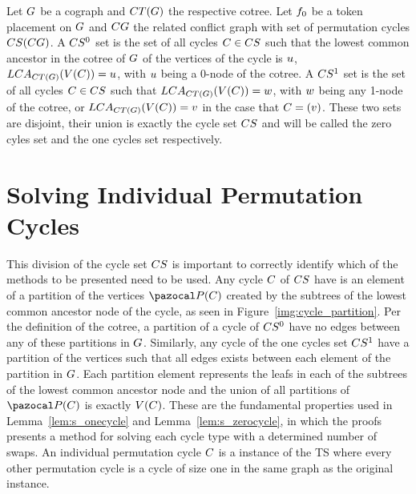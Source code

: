 \documentclass[msc]{ppgccufmg}    %
\begin{document}

Let $G$ be a cograph and $CT(G)$ the respective cotree. 
Let $f_{0}$ be a token placement on $G$ and $CG$ the related 
conflict graph with set of permutation cycles $CS(CG)$.
A $CS^{0}$ set is the set of all cycles $C \in CS$ such that
the lowest common ancestor in the cotree of $G$ of the vertices of the cycle
is $u$, $LCA_{CT(G)}(V(C)) = u$, with 
$u$ being a 0-node of the cotree.
A $CS^{1}$ set is the set of all cycles $C \in CS$ such that
$LCA_{CT(G)}(V(C)) = w$, with $w$ being any
1-node of the cotree, or $LCA_{CT(G)}(V(C)) = v$ 
in the case that $C = (v)$.
These two sets are disjoint, their union is exactly the cycle set $CS$ and
will be called the zero cyles set and the one cycles set respectively.


\section{Solving Individual Permutation Cycles}
\label{sec:solvindpermcycles}

This division of the cycle set $CS$ is important to correctly identify which
of the methods to be presented need to be used.
Any cycle $C$ of  $CS$ have is an element of a partition of the vertices $\partitionFunc
{\cycle}$ created by the subtrees of the lowest common ancestor node of the cycle, 
as seen in Figure~\ref{img:cycle_partition}. 
Per the definition of the cotree, a partition of a cycle of $CS^{0}$ have no 
edges between any of these partitions in $G$.
Similarly, any cycle of the one cycles set $CS^{1}$ have a partition of the
vertices such that all edges exists between each element of the partition in $G$.
Each partition element represents the leafs in each of the subtrees of the lowest 
common ancestor node and the union of all partitions of $\partitionFunc{\cycle}$ is 
exactly $V(C)$.
These are the fundamental properties used in Lemma~\ref{lem:s_onecycle} and 
Lemma~\ref{lem:s_zerocycle}, in which the proofs presents a method for solving 
each cycle type with a determined number of swaps.
An individual permutation cycle $C$ is a instance of the TS where every other
permutation cycle is a cycle of size one in the same graph as the original
instance.
\end{document}
